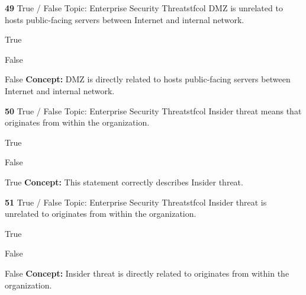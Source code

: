 \documentclass[10pt,a4paper]{article}
\begin{document}
\begin{qcard}{\color{white}\textbf{49} \hfill \small True / False \textbar{} Topic: Enterprise Security Threats}{tfcol}
DMZ is unrelated to hosts public-facing servers between Internet and internal network.

\begin{qoptions}
\item True
\item False
\end{qoptions}
\begin{explainbox}{False}
\textbf{Concept:} DMZ is directly related to hosts public-facing servers between Internet and internal network.
\end{explainbox}
\end{qcard}

\begin{qcard}{\color{white}\textbf{50} \hfill \small True / False \textbar{} Topic: Enterprise Security Threats}{tfcol}
Insider threat means that originates from within the organization.

\begin{qoptions}
\item True
\item False
\end{qoptions}
\begin{explainbox}{True}
\textbf{Concept:} This statement correctly describes Insider threat.
\end{explainbox}
\end{qcard}

\begin{qcard}{\color{white}\textbf{51} \hfill \small True / False \textbar{} Topic: Enterprise Security Threats}{tfcol}
Insider threat is unrelated to originates from within the organization.

\begin{qoptions}
\item True
\item False
\end{qoptions}
\begin{explainbox}{False}
\textbf{Concept:} Insider threat is directly related to originates from within the organization.
\end{explainbox}
\end{qcard}
\end{document}
